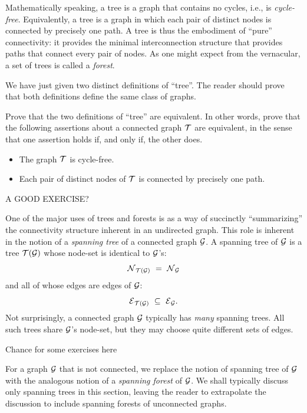 Mathematically speaking, a tree is a graph that contains no cycles,
i.e., is {\it cycle-free}.  Equivalently, a
tree is a graph in which each pair of distinct nodes is connected by
precisely one path.  A tree is thus the embodiment of ``pure''
connectivity: it provides the minimal interconnection structure that
provides paths that connect every pair of nodes.  As one might expect
from the vernacular, a set of trees is called a {\it
  forest}. 

We have just given two distinct definitions of ``tree''.  The reader
should prove that both definitions define the same class of graphs.

\begin{prop}
\label{thm:2defns-trees}
Prove that the two definitions of ``tree'' are equivalent.  In other
words, prove that the following assertions about a connected graph
$\mbox{$\cal T$}$ are equivalent, in the sense that one assertion holds if, and
only if, the other does.
\begin{itemize}
\item
The graph $\mbox{$\cal T$}$ is cycle-free.
\item
Each pair of distinct nodes of $\mbox{$\cal T$}$ is connected by precisely one
path.
\end{itemize}
\end{prop}

{\Arny A GOOD EXERCISE?}

One of the major uses of trees and forests is as a way of succinctly
``summarizing'' the connectivity structure inherent in an undirected
graph.  This role is inherent in the notion of a {\it spanning tree}
  of a connected
graph $\mbox{$\cal G$}$.  A spanning tree of $\mbox{$\cal G$}$ is a tree $\mbox{$\cal T$}(\mbox{$\cal G$})$ whose node-set
is identical to $\mbox{$\cal G$}$'s:
\[ \mbox{$\cal N$}_{\mbox{{\scriptsize $\cal T$}}(\mbox{{\scriptsize $\cal G$}})} \ = \ \mbox{$\cal N$}_{\mbox{{\scriptsize $\cal G$}}} \]
and all of whose edges are edges of $\mbox{$\cal G$}$:
\[ \mbox{$\cal E$}_{\mbox{{\scriptsize $\cal T$}}(\mbox{{\scriptsize $\cal G$}})} \ \subseteq \ \mbox{$\cal E$}_{\mbox{{\scriptsize $\cal G$}}}. \]
Not surprisingly, a connected graph $\mbox{$\cal G$}$  typically has {\em many}
spanning trees.  All such trees share $\mbox{$\cal G$}$'s node-set, but they may
choose quite different sets of edges.

{\Arny Chance for some exercises here}

For a graph $\mbox{$\cal G$}$ that is not connected, we replace the notion of
spanning tree of $\mbox{$\cal G$}$ with the analogous notion of a {\it spanning
  forest}   of
$\mbox{$\cal G$}$.  We shall typically discuss only spanning trees in this section,
leaving the reader to extrapolate the discussion to include spanning
forests of unconnected graphs.

